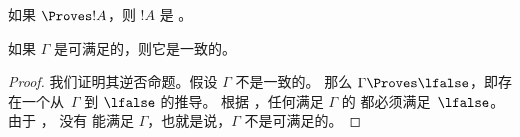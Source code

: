 \documentclass[../../../include/open-logic-section]{subfiles}
\begin{document}
\tagendprob

\begin{cor}
如果 $\Proves !A$，则 $!A$ 是 。
\end{cor}

\begin{cor}
如果 $\Gamma$ 是可满足的，则它是一致的。
\end{cor}

\begin{proof}
我们证明其逆否命题。假设 $\Gamma$ 不是一致的。
那么 $\Gamma \Proves \lfalse$，即存在一个从~$\Gamma$ 到 $\lfalse$ 的推导。
根据 ，任何满足 $\Gamma$ 的
都必须满足~$\lfalse$。由于
，
没有
能满足 $\Gamma$，也就是说，$\Gamma$ 不是可满足的。
\end{proof}
\end{document}
